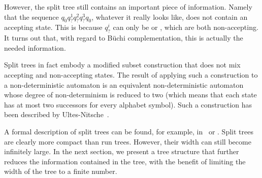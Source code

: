 However, the split tree still contains an important piece of information. Namely that the sequence $q_{0}q^1_?q^2_?q^3_?q_{0}$, whatever it really looks like, does not contain an accepting state. This is because $q^i_?$ can only be  or , which are both non-accepting. It turns out that, with regard to  Büchi complementation, this is actually the needed information.

Split trees in fact embody a modified subset construction that does not mix accepting and non-accepting states. The result of applying such a construction to a non-deterministic automaton is an equivalent non-deterministic automaton whose degree of non-determinism is reduced to two (which means that each state has at most two successors for every alphabet symbol). Such a construction has been described by Ultes-Nitsche~\cite{UltesNitsche2007107}.

A formal description of split trees can be found, for example, in~\cite{vardi2007automata} or \cite{fogarty2013unifying}. Split trees are clearly more compact than run trees. However, their width can still become infinitely large. In the next section, we present a tree structure that further reduces the information contained in the tree, with the benefit of limiting the width of the tree to a finite number.





